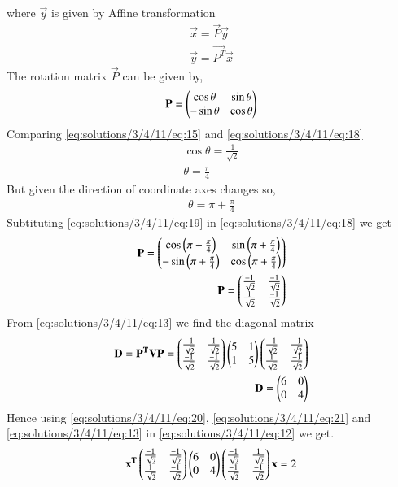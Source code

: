 where $\vec{y}$ is given by Affine transformation
\begin{align}
\vec{x}=\vec{P}\vec{y} \\
\vec{y}=\vec{P^T}\vec{x} \label{eq:solutions/3/4/11/eq:22}
\end{align}
The rotation matrix $\vec{P}$ can be given by,
\begin{align}
\mathbf{P}=\begin{pmatrix}\cos{\theta}&\sin{\theta}\\-\sin{\theta}&\cos{\theta}\end{pmatrix}\label{eq:solutions/3/4/11/eq:18}
\end{align}
Comparing \eqref{eq:solutions/3/4/11/eq:15} and \eqref{eq:solutions/3/4/11/eq:18}
\begin{align}
\cos{\theta} = \frac{1}{\sqrt{2}}\\
\theta = \frac{\pi}{4} 
\end{align}
But given the direction of coordinate axes changes so,
\begin{align}
\theta = \pi +\frac{\pi}{4}\label{eq:solutions/3/4/11/eq:19}
\end{align}
Subtituting \eqref{eq:solutions/3/4/11/eq:19} in \eqref{eq:solutions/3/4/11/eq:18} we get 
\begin{align}
\mathbf{P}=\begin{pmatrix}\cos{\ensuremath{\left(\pi +\frac{\pi}{4}\right)}} & \sin{\ensuremath{\left(\pi +\frac{\pi}{4}\right)}}\\-\sin{\ensuremath{\left(\pi +\frac{\pi}{4}\right)}}&\cos{\ensuremath{\left(\pi +\frac{\pi}{4}\right)}}\end{pmatrix}\\
\mathbf{P}=\begin{pmatrix}\frac{-1}{\sqrt{2}}&\frac{-1}{\sqrt{2}}\\\frac{1}{\sqrt{2}}&\frac{-1}{\sqrt{2}}\end{pmatrix}\label{eq:solutions/3/4/11/eq:20}
\end{align}
From \eqref{eq:solutions/3/4/11/eq:13} we find the diagonal matrix
\begin{align}
\mathbf{D}=\mathbf{P^T}\mathbf{V}\mathbf{P} = \begin{pmatrix}\frac{-1}{\sqrt{2}}&\frac{1}{\sqrt{2}}\\\frac{-1}{\sqrt{2}}&\frac{-1}{\sqrt{2}}\end{pmatrix}\begin{pmatrix}5&1\\1&5\end{pmatrix}\begin{pmatrix}\frac{-1}{\sqrt{2}}&\frac{-1}{\sqrt{2}}\\\frac{1}{\sqrt{2}}&\frac{-1}{\sqrt{2}}\end{pmatrix}\\
\mathbf{D}=\begin{pmatrix}6&0\\0&4\end{pmatrix}\label{eq:solutions/3/4/11/eq:21}
\end{align}
Hence using \eqref{eq:solutions/3/4/11/eq:20}, \eqref{eq:solutions/3/4/11/eq:21} and \eqref{eq:solutions/3/4/11/eq:13} in \eqref{eq:solutions/3/4/11/eq:12} we get.
\begin{align}
\mathbf{x^T}\begin{pmatrix}\frac{-1}{\sqrt{2}}&\frac{-1}{\sqrt{2}}\\\frac{1}{\sqrt{2}}&\frac{-1}{\sqrt{2}}\end{pmatrix}\begin{pmatrix}6&0\\0&4\end{pmatrix}\begin{pmatrix}\frac{-1}{\sqrt{2}}&\frac{1}{\sqrt{2}}\\\frac{-1}{\sqrt{2}}&\frac{-1}{\sqrt{2}}\end{pmatrix}\mathbf{x}=2
\end{align}
